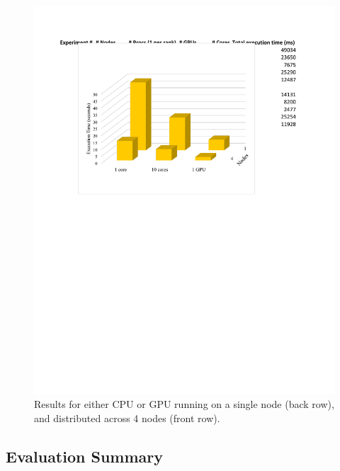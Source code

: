 \begin{figure}
    \centering
    \includegraphics[width=0.95\columnwidth]{figures/results_heterogeneous.pdf}
    \caption{Results for either CPU or GPU running on a single node (back row), and distributed across 4 nodes (front row). }
    \label{fig:tiramisu_hybrid}
\end{figure}


\vspace{-0.25cm}
\subsection{Evaluation Summary}

